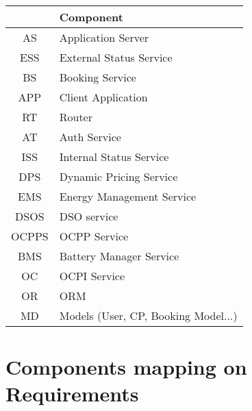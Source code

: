 \begin{tabular}{|c|l|}
	\hline
	\bf{} & \bf{Component} \\
	\hline
	AS & Application Server\\
	\hline
	ESS & External Status Service\\
	\hline
	BS & Booking Service\\
	\hline
	APP & Client Application\\
	\hline
	RT & Router\\
	\hline
	AT & Auth Service\\
	\hline
	ISS & Internal Status Service\\
	\hline
	DPS & Dynamic Pricing Service\\
	\hline
	EMS & Energy Management Service\\
	\hline
	DSOS & DSO service\\
	\hline
	OCPPS & OCPP Service\\
	\hline
	BMS & Battery Manager Service\\
	\hline
	OC & OCPI Service\\
	\hline
	OR & ORM\\
	\hline
	MD & Models (User, CP, Booking Model...)\\
	\hline
\end{tabular}

\section{Components mapping on Requirements}

